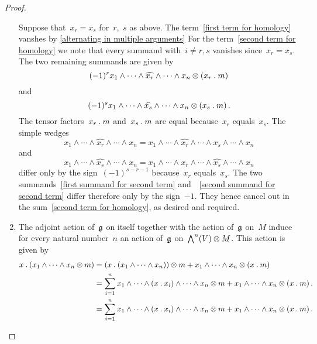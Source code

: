 \begin{proof}
\begin{enumerate}
			Suppose that~$x_r = x_s$ for~$r$,~$s$ as above.
			The term~\eqref{first term for homology} vanshes by \cref{alternating in multiple arguments}
			For the term~\eqref{second term for homology} we note that every summand with~$i \neq r, s$ vanishes since~$x_r = x_s$.
			The two remaining summands are given by
			\begin{equation}
				\label{first summand for second term}
				(-1)^r x_1 \wedge \dotsb \wedge \widehat{x_r} \wedge \dotsb \wedge x_n \otimes (x_r \mathbin{.} m)
			\end{equation}
			and
			\begin{equation}
				\label{second summand for second term}
				(-1)^s x_1 \wedge \dotsb \wedge \widehat{x_s} \wedge \dotsb \wedge x_n \otimes (x_s \mathbin{.} m) \,.
			\end{equation}
			The tensor factors~$x_r \mathbin{.} m$ and~$x_s \mathbin{.} m$ are equal because~$x_r$ equals~$x_s$.
			The simple wedges
			\[
				x_1 \wedge \dotsb \wedge \widehat{x_r} \wedge \dotsb \wedge x_n
				=
				x_1 \wedge \dotsb \wedge \widehat{x_r} \wedge \dotsb \wedge x_s \wedge \dotsb \wedge x_n
			\]
			and
			\[
				x_1 \wedge \dotsb \wedge \widehat{x_s} \wedge \dotsb \wedge x_n
				=
				x_1 \wedge \dotsb \wedge x_r \wedge \dotsb \wedge \widehat{x_s} \wedge \dotsb \wedge x_n
			\]
			differ only by the sign~$(-1)^{s-r-1}$ because~$x_r$ equals~$x_s$.
			The two summands~\eqref{first summand for second term} and~~\eqref{second summand for second term} differ therefore only by the sign~$-1$.
			They hence cancel out in the sum~\eqref{second term for homology}, as desired and required.
		\item
			The adjoint action of~$\mathfrak{g}$ on itself together with the action of~$\mathfrak{g}$ on~$M$ induce for every natural number~$n$ an action of~$\mathfrak{g}$ on~$\operatorname{\bigwedge}^n(V) \otimes M$.
			This action is given by
			\begin{align*}
				x \mathbin{.} (x_1 \wedge \dotsb \wedge x_n \otimes m)
				&=
				(x \mathbin{.} (x_1 \wedge \dotsb \wedge x_n)) \otimes m
				+ x_1 \wedge \dotsb \wedge x_n \otimes (x \mathbin{.} m)
				\\
				&=
				\sum_{i=1}^n x_1 \wedge \dotsb \wedge (x \mathbin{.} x_i) \wedge \dotsb \wedge x_n \otimes m
				+ x_1 \wedge \dotsb \wedge x_n \otimes (x \mathbin{.} m) \,.
				\\
				&=
				\sum_{i=1}^n x_1 \wedge \dotsb \wedge (x \mathbin{.} x_i) \wedge \dotsb \wedge x_n \otimes m
				+ x_1 \wedge \dotsb \wedge x_n \otimes (x \mathbin{.} m) \,.
			\end{align*}


\end{enumerate}
\end{proof}
